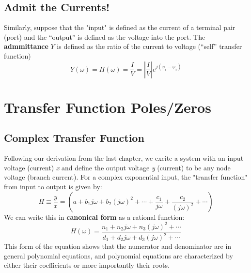 \subsection{Admit the Currents!}
Similarly, suppose that the "input" is defined as the current of a terminal pair (port) and the “output” is defined as the voltage into the port. The \textbf{admmittance} $Y$ is defined as the ratio of the current to voltage (“self” transfer function)
    \begin{equation}
        Y(\omega ) = H(\omega ) = \frac{I}{V} = \left| {\frac{I}{V}} \right|{e^{j({\varphi _i} - {\varphi _v})}}
    \end{equation}
\section{Transfer Function Poles/Zeros}
\subsection{Complex Transfer Function}
Following our derivation from the last chapter, we excite a system with an input voltage (current) \textit{x} and define the output voltage \textit{y} (current) to be any node voltage (branch current).  For a complex exponential input, the "transfer function" from input to output is given by:
    \begin{equation}
        H \equiv \frac{y}{x} = \left( {a + {b_1}j\omega  + {b_2}{{(j\omega )}^2} +  \cdots  + \frac{{{c_1}}}{{j\omega }} + \frac{{{c_2}}}{{{{(j\omega )}^2}}} +  \cdots } \right)
    \end{equation}
 We can write this in \textbf{canonical form} as a rational function:
    \begin{equation}
        H(\omega ) = \frac{{{n_1} + {n_2}j\omega  + {n_3}{{(j\omega )}^2} +  \cdots }}{{{d_1} + {d_2}j\omega  + {d_3}{{(j\omega )}^2} +  \cdots }}
    \end{equation}
This form of the equation shows that the numerator and denominator are in general polynomial equations, and polynomial equations are characterized by either their coefficients or more importantly their roots.
